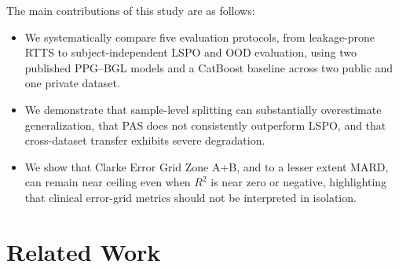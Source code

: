 \documentclass{article}
\begin{document}
The main contributions of this study are as follows:

\begin{itemize}

\item We systematically compare five evaluation protocols, from leakage-prone RTTS to subject-independent LSPO and OOD evaluation, using two published PPG--BGL models and a CatBoost baseline across two public and one private dataset.

\item We demonstrate that sample-level splitting can substantially overestimate generalization, that PAS does not consistently outperform LSPO, and that cross-dataset transfer exhibits severe degradation.

\item We show that Clarke Error Grid Zone A+B, and to a lesser extent MARD, can remain near ceiling even when $R^2$ is near zero or negative, highlighting that clinical error-grid metrics should not be interpreted in isolation.

\end{itemize}

\section{Related Work}
\end{document}
